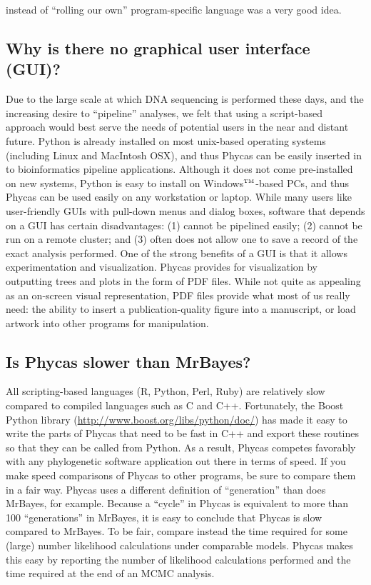 \documentclass[10pt]{article}
\newcommand{\trademark}[1]{#1${}^{\mbox{\tiny TM}}$}
\begin{document}
instead of ``rolling our own'' program-specific language was a very good idea.

\subsection{Why is there no graphical user interface (GUI)?}
Due to the large scale at which DNA sequencing is performed these days, and the increasing desire to ``pipeline'' analyses, we felt that using a script-based approach would best serve the needs of potential users in the near and distant future. Python is already installed on most unix-based operating systems (including Linux and MacIntosh OSX), and thus Phycas can be easily inserted in to bioinformatics pipeline applications. Although it does not come pre-installed on new systems, Python is easy to install on \trademark{Windows}-based PCs, and thus Phycas can be used easily on any workstation or laptop. While many users like user-friendly GUIs with pull-down menus and dialog boxes, software that depends on a GUI has certain disadvantages: (1) cannot be pipelined easily; (2) cannot be run on a remote cluster; and (3) often does not allow one to save a record of the exact analysis performed. One of the strong benefits of a GUI is that it allows experimentation and visualization. Phycas provides for visualization by outputting trees and plots in the form of PDF files. While not quite as appealing as an on-screen visual representation, PDF files provide what most of us really need: the ability to insert a publication-quality figure into a manuscript, or load artwork into other programs for manipulation.  

\subsection{Is Phycas slower than MrBayes?}
All scripting-based languages (R, Python, Perl, Ruby) are relatively slow compared to compiled languages such as C and C++. Fortunately, the Boost Python library (\url{http://www.boost.org/libs/python/doc/}) has made it easy to write the parts of Phycas that need to be fast in C++ and export these routines so that they can be called from Python. As a result, Phycas competes favorably with any phylogenetic software application out there in terms of speed. If you make speed comparisons of Phycas to other programs, be sure to compare them in a fair way. Phycas uses a different definition of ``generation'' than does MrBayes, for example. Because a ``cycle'' in Phycas is equivalent to more than 100 ``generations'' in MrBayes, it is easy to conclude that Phycas is slow compared to MrBayes. To be fair, compare instead the time required for some (large) number likelihood calculations under comparable models. Phycas makes this easy by reporting the number of likelihood calculations performed and the time required at the end of an MCMC analysis.
\end{document}
